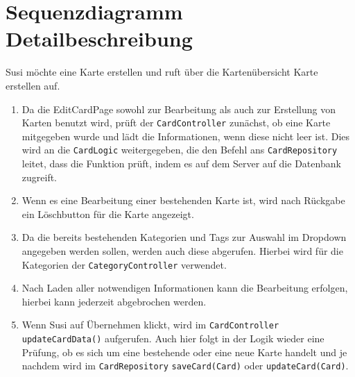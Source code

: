 \documentclass[fontsize=12pt,paper=A4,twoside]{scrartcl}
\begin{document}
    \section{Sequenzdiagramm Detailbeschreibung}
    Susi möchte eine Karte erstellen und ruft über die Kartenübersicht Karte erstellen auf.\\
    \begin{enumerate}
    \item Da die EditCardPage sowohl zur Bearbeitung als auch zur Erstellung von Karten benutzt wird, prüft der \texttt{CardController}
    zunächst, ob eine Karte mitgegeben wurde und lädt die Informationen, wenn diese nicht leer ist. Dies wird an die \texttt{CardLogic} weitergegeben, die 
    den Befehl ans \texttt{CardRepository} leitet, dass die Funktion prüft, indem es auf dem Server auf die Datenbank zugreift.
    \item Wenn es eine Bearbeitung einer bestehenden Karte ist, wird nach Rückgabe ein Löschbutton für die Karte angezeigt.
    \item Da die bereits bestehenden Kategorien und Tags zur Auswahl im Dropdown angegeben werden sollen, werden auch diese abgerufen.
    Hierbei wird für die Kategorien der \texttt{CategoryController} verwendet.
    \item Nach Laden aller notwendigen Informationen kann die Bearbeitung erfolgen, hierbei kann jederzeit abgebrochen werden.
    \item Wenn Susi auf Übernehmen klickt, wird im \texttt{CardController} \texttt{updateCardData()} aufgerufen. Auch hier folgt
    in der Logik wieder eine Prüfung, ob es sich um eine bestehende oder eine neue Karte handelt und je nachdem wird im \texttt{CardRepository}
    \texttt{saveCard(Card)} oder \texttt{updateCard(Card)}.
    \end{enumerate}
\end{document}
